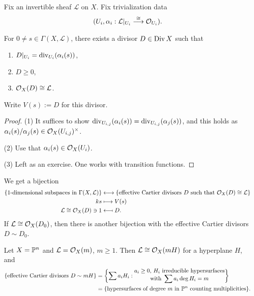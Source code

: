 \begin{remark}
  Fix an invertible sheaf
  $\mathcal{L}$ on $X$. Fix trivialization
  data
  \[
    (U_i, \alpha_i : \mathcal{L}|_{U_i}
    \overset{\cong}{\longrightarrow} \mathcal{O}_{U_i}).
  \]
\end{remark}

\pagebreak

\begin{prop}
  For $0 \ne s \in \Gamma(X, \mathcal{L})$,
  there exists a divisor $D \in \operatorname{Div} X$
  such that
  \begin{enumerate}
    \item $D|_{U_i} = \operatorname{div}_{U_i}(\alpha_i(s))$,
    \item $D \ge 0$,
    \item $\mathcal{O}_X(D) \cong \mathcal{L}$.
  \end{enumerate}
  Write $V(s) := D$ for this
  divisor.
\end{prop}

\begin{proof}
  (1) It suffices to show
  $\operatorname{div}_{U_{i, j}}(\alpha_i(s))
  = \operatorname{div}_{U_{i, j}}(\alpha_j(s))$, and
  this holds as
  $\alpha_i(s) / \alpha_j(s) \in \mathcal{O}_X(U_{i, j})^\times$.

  (2) Use that $\alpha_i(s) \in \mathcal{O}_X(U_i)$.

  (3) Left as an exercise. One
  works with transition functions.
\end{proof}

\begin{remark}
  We get a bijection
  \begin{align*}
    \{
      \text{$1$-dimensional subspaces in
      $\Gamma(X, \mathcal{L})$}
    \}
    &\longleftrightarrow
    \{
      \text{effective Cartier divisors
      $D$ such that
    $\OO_X(D) \cong \mathcal{L}$}
    \} \\
    ks &\longmapsto V(s) \\
    \mathcal{L} \cong \OO_X(D) \ni 1
    &\mathrel{\reflectbox{\ensuremath{\longmapsto}}}
    D.
  \end{align*}
  If $\mathcal{L} \cong \mathcal{O}_X(D_0)$,
  then there is another bijection with the
  effective Cartier divisors $D \sim D_0$.
\end{remark}

\begin{example}
  Let $X = \mathbb{P}^n$ and
  $\mathcal{L} = \mathcal{O}_X(m)$, $m \ge 1$.
  Then $\mathcal{L} \cong \mathcal{O}_X(mH)$
  for a hyperplane $H$, and
  \begin{align*}
    \{
      \text{effective Cartier divisors
      $D \sim mH$}
    \}
    &=
    \left\{
      \sum a_i H_i :
      \substack{\displaystyle a_i \ge 0,\, H_i
      \text{ irreducible hypersurfaces} \\
  \displaystyle \text{with }\sum a_i \deg H_i = m}
    \right\} \\
    &= \{\text{hypersurfaces of degree
    $m$ in $\mathbb{P}^n$ counting multiplicities}\}.
  \end{align*}
\end{example}

